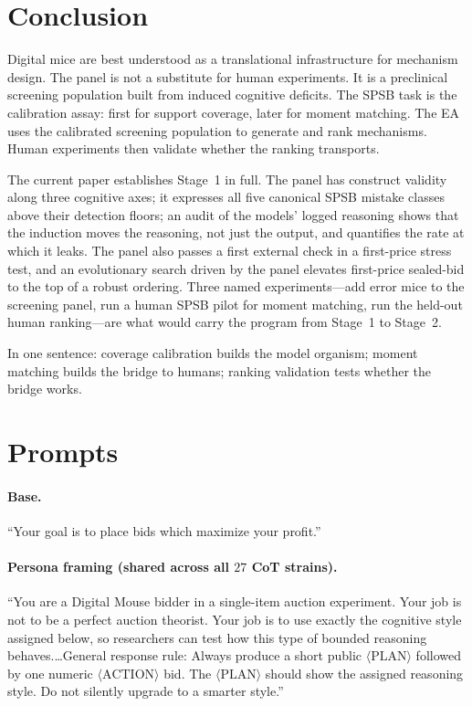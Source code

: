 \documentclass[12pt]{article}
\newcommand{\SPSB}{SPSB}
\newcommand{\EA}{EA}
\begin{document}
\section{Conclusion}
\label{sec:conclusion}

Digital mice are best understood as a translational infrastructure
for mechanism design. The panel is not a substitute for human
experiments. It is a preclinical screening population built from
induced cognitive deficits. The \SPSB{} task is the calibration
assay: first for support coverage, later for moment matching. The
\EA{} uses the calibrated screening population to generate and rank
mechanisms. Human experiments then validate whether the ranking
transports.

The current paper establishes Stage~1 in full. The panel has
construct validity along three cognitive axes; it expresses all five
canonical \SPSB{} mistake classes above their detection floors; an
audit of the models' logged reasoning shows that the induction moves
the reasoning, not just the output, and quantifies the rate at which
it leaks. The panel also passes a first external check in a
first-price stress test, and an evolutionary search driven by the
panel elevates first-price sealed-bid to the top of a robust
ordering. Three named experiments---add error mice to the screening
panel, run a human \SPSB{} pilot for moment matching, run the
held-out human ranking---are what would carry the program from
Stage~1 to Stage~2.

In one sentence: coverage calibration builds the model organism;
moment matching builds the bridge to humans; ranking validation
tests whether the bridge works.

\appendix

\section{Prompts}
\label{app:prompts}

\paragraph{Base.} ``Your goal is to place bids which maximize your
profit.''

\paragraph{Persona framing (shared across all $27$ CoT strains).} ``You
are a Digital Mouse bidder in a single-item auction experiment. Your
job is not to be a perfect auction theorist. Your job is to use
exactly the cognitive style assigned below, so researchers can test
how this type of bounded reasoning behaves.\dots General response
rule: Always produce a short public $\langle\mathrm{PLAN}\rangle$
followed by one numeric $\langle\mathrm{ACTION}\rangle$ bid. The
$\langle\mathrm{PLAN}\rangle$ should show the assigned reasoning
style. Do not silently upgrade to a smarter style.''
\end{document}
